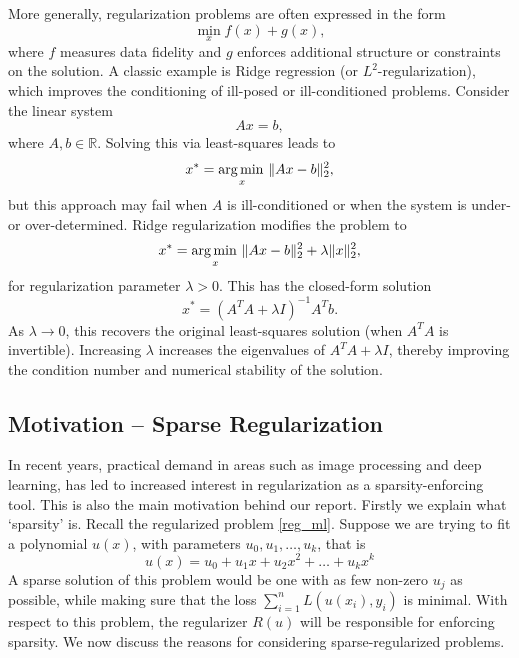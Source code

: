 \documentclass[11pt, twoside]{report}
\begin{document}
More generally, regularization problems are often expressed in the form
\[
\min_x f(x) + g(x),
\]
where $f$ measures data fidelity and $g$ enforces additional structure or constraints on the solution. A classic example is Ridge regression (or $L^2$-regularization), which improves the conditioning of ill-posed or ill-conditioned problems. Consider the linear system
\begin{equation} \label{lin_sys}
    Ax = b,
\end{equation}
where $A, b \in \mathbb{R}$. Solving this via least-squares leads to
\[
x^* = \operatorname*{arg\, min \,}_{x} \|Ax - b\|_2^2,
\]
but this approach may fail when $A$ is ill-conditioned or when the system is under- or over-determined. Ridge regularization modifies the problem to
\[
x^* = \operatorname*{arg\, min \,}_{x} \|Ax - b\|_2^2 + \lambda \|x\|_2^2,
\]
for regularization parameter $\lambda > 0$. This has the closed-form solution
\[
x^* = (A^T A + \lambda I)^{-1} A^T b.
\]
As $\lambda \to 0$, this recovers the original least-squares solution (when $A^T A$ is invertible). Increasing $\lambda$ increases the eigenvalues of $A^T A + \lambda I$, thereby improving the condition number and numerical stability of the solution.


\subsection{Motivation -- Sparse Regularization}
In recent years, practical demand in areas such as image processing and deep learning, has led to increased interest in regularization as a sparsity-enforcing tool. This is also the main motivation behind our report. Firstly we explain what `sparsity' is. Recall the regularized problem \eqref{reg_ml}. Suppose we are trying to fit a polynomial $u(x)$, with parameters $u_0,u_1,\hdots, u_k$, that is
\[u(x) = u_0 + u_1 x + u_2 x^2 + \hdots + u_kx^k\]
A sparse solution of this problem would be one with as few non-zero $u_j$ as possible, while making sure that the loss $\sum^n_{i=1} L(u(x_i),y_i)$ is minimal. With respect to this problem, the regularizer $R(u)$ will be responsible for enforcing sparsity. We now discuss the reasons for considering sparse-regularized problems.
\end{document}
